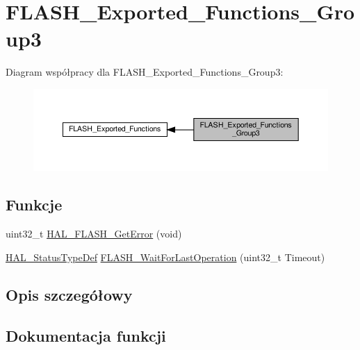 \hypertarget{group___f_l_a_s_h___exported___functions___group3}{}\section{F\+L\+A\+S\+H\+\_\+\+Exported\+\_\+\+Functions\+\_\+\+Group3}
\label{group___f_l_a_s_h___exported___functions___group3}
Diagram współpracy dla F\+L\+A\+S\+H\+\_\+\+Exported\+\_\+\+Functions\+\_\+\+Group3\+:\nopagebreak
\begin{figure}[H]
\begin{center}
\leavevmode
\includegraphics[width=350pt]{group___f_l_a_s_h___exported___functions___group3}
\end{center}
\end{figure}
\subsection*{Funkcje}
\begin{DoxyCompactItemize}
\item 
uint32\+\_\+t \hyperlink{group___f_l_a_s_h___exported___functions___group3_ga20e71ba6b2a09cd5b9f0bd369f842de3}{H\+A\+L\+\_\+\+F\+L\+A\+S\+H\+\_\+\+Get\+Error} (void)
\item 
\hyperlink{stm32f4xx__hal__def_8h_a63c0679d1cb8b8c684fbb0632743478f}{H\+A\+L\+\_\+\+Status\+Type\+Def} \hyperlink{group___f_l_a_s_h___exported___functions___group3_gaf89afc110a32ac9dcf0d06b89ffd9224}{F\+L\+A\+S\+H\+\_\+\+Wait\+For\+Last\+Operation} (uint32\+\_\+t Timeout)
\end{DoxyCompactItemize}


\subsection{Opis szczegółowy}


\subsection{Dokumentacja funkcji}
\mbox{\label{group___f_l_a_s_h___exported___functions___group3_gaf89afc110a32ac9dcf0d06b89ffd9224}} 
